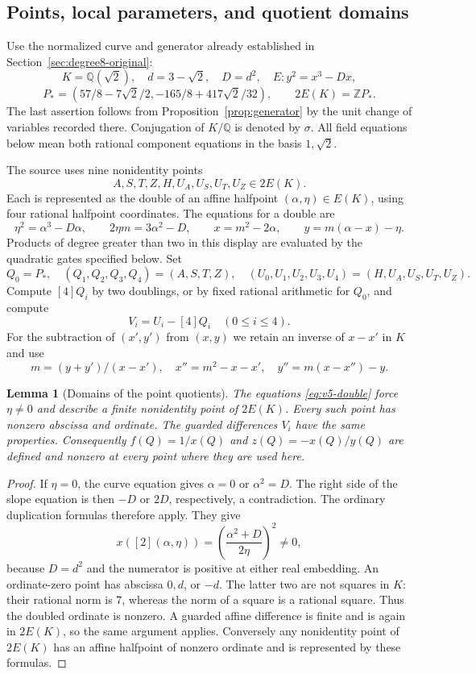 \documentclass[11pt]{article}
\newtheorem{lemma}[theorem]{Lemma}
\theoremstyle{definition}
\theoremstyle{remark}
\newcommand{\Q}{\mathbb Q}
\newcommand{\Z}{\mathbb Z}
\begin{document}
\subsection{Points, local parameters, and quotient domains}
\label{subsec:v5-point-source}

Use the normalized curve and generator already established in
Section~\ref{sec:degree8-original}:
\[
 K=\Q(\sqrt2),\quad d=3-\sqrt2,\quad D=d^2,
 \quad E:y^2=x^3-Dx,
\]
\[
 P_*=(57/8-7\sqrt2/2,-165/8+417\sqrt2/32),
 \qquad 2E(K)=\Z P_*.
\]
The last assertion follows from Proposition~\ref{prop:generator} by the
unit change of variables recorded there. Conjugation of $K/\Q$ is
denoted by $\sigma$. All field equations below mean both rational
component equations in the basis $1,\sqrt2$.

The source uses nine nonidentity points
\[
 A,S,T,Z,H,U_A,U_S,U_T,U_Z\in2E(K).
\]
Each is represented as the double of an affine halfpoint
$(\alpha,\eta)\in E(K)$, using four rational halfpoint coordinates.
The equations for a double are
\begin{equation}\label{eq:v5-double}
 \eta^2=\alpha^3-D\alpha,\qquad
 2\eta m=3\alpha^2-D,\qquad
 x=m^2-2\alpha,\qquad y=m(\alpha-x)-\eta.
\end{equation}
Products of degree greater than two in this display are evaluated by
the quadratic gates specified below. Set
\[
 Q_0=P_*,\quad(Q_1,Q_2,Q_3,Q_4)=(A,S,T,Z),
 \quad(U_0,U_1,U_2,U_3,U_4)=(H,U_A,U_S,U_T,U_Z).
\]
Compute $[4]Q_i$ by two doublings, or by fixed rational arithmetic for
$Q_0$, and compute
\[
 V_i=U_i-[4]Q_i\quad(0\le i\le4).
\]
For the subtraction of $(x',y')$ from $(x,y)$ we retain an inverse of
$x-x'$ in $K$ and use
\[
 m=(y+y')/(x-x'),\quad x''=m^2-x-x',\quad
 y''=m(x-x'')-y.
\]

\begin{lemma}[Domains of the point quotients]\label{lem:v5-point-domains}
The equations \eqref{eq:v5-double} force $\eta\ne0$ and describe a
finite nonidentity point of $2E(K)$. Every such point has nonzero
abscissa and ordinate. The guarded differences $V_i$ have the same
properties. Consequently $f(Q)=1/x(Q)$ and $z(Q)=-x(Q)/y(Q)$ are
defined and nonzero at every point where they are used here.
\end{lemma}
\begin{proof}
If $\eta=0$, the curve equation gives $\alpha=0$ or $\alpha^2=D$.
The right side of the slope equation is then $-D$ or $2D$, respectively,
a contradiction. The ordinary duplication formulas therefore apply.
They give
\[
 x([2](\alpha,\eta))=
 \left(\frac{\alpha^2+D}{2\eta}\right)^2\ne0,
\]
because $D=d^2$ and the numerator is positive at either real embedding.
An ordinate-zero point has abscissa $0,d$, or $-d$.
The latter two are not squares in $K$: their rational norm is 7,
whereas the norm of a square is a rational square. Thus the doubled
ordinate is nonzero. A guarded affine difference is finite and is
again in $2E(K)$, so the same argument applies. Conversely any
nonidentity point of $2E(K)$ has an affine halfpoint of nonzero
ordinate and is represented by these formulas.
\end{proof}
\end{document}
